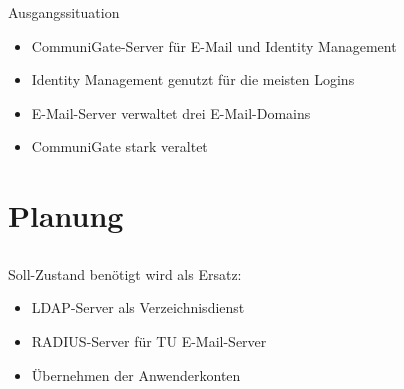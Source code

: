\documentclass[presentation,svgnames,12pt]{beamer}
\begin{document}
\begin{frame}{Ausgangssituation}
\begin{itemize}
	\item CommuniGate-Server für E-Mail und Identity Management
	\item Identity Management genutzt für die meisten Logins
	\item E-Mail-Server verwaltet drei E-Mail-Domains%
 	\item CommuniGate stark veraltet%
\end{itemize}
\end{frame}


\section{Planung}
\subsection{}
\begin{frame}{Soll-Zustand}
benötigt wird als Ersatz:
\vspace{6pt}
\begin{itemize}
	\item LDAP-Server als Verzeichnisdienst%
	\item RADIUS-Server für TU E-Mail-Server
	\item Übernehmen der Anwenderkonten
\end{itemize}
\end{frame}
\end{document}
